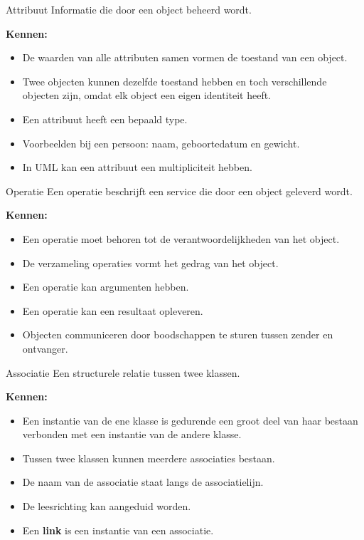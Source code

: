 \documentclass[11pt,a4paper]{article}
\begin{document}
\begin{definition}{Attribuut}
Informatie die door een object beheerd wordt.

\textbf{Kennen:}
\begin{itemize}
    \item De waarden van alle attributen samen vormen de toestand van een object.
    \item Twee objecten kunnen dezelfde toestand hebben en toch verschillende objecten zijn, omdat elk object een eigen identiteit heeft.
    \item Een attribuut heeft een bepaald type.
    \item Voorbeelden bij een persoon: naam, geboortedatum en gewicht.
    \item In UML kan een attribuut een multipliciteit hebben.
\end{itemize}
\end{definition}

\begin{definition}{Operatie}
Een operatie beschrijft een service die door een object geleverd wordt.

\textbf{Kennen:}
\begin{itemize}
    \item Een operatie moet behoren tot de verantwoordelijkheden van het object.
    \item De verzameling operaties vormt het gedrag van het object.
    \item Een operatie kan argumenten hebben.
    \item Een operatie kan een resultaat opleveren.
    \item Objecten communiceren door boodschappen te sturen tussen zender en ontvanger.
\end{itemize}
\end{definition}

\begin{definition}{Associatie}
Een structurele relatie tussen twee klassen.

\textbf{Kennen:}
\begin{itemize}
    \item Een instantie van de ene klasse is gedurende een groot deel van haar bestaan verbonden met een instantie van de andere klasse.
    \item Tussen twee klassen kunnen meerdere associaties bestaan.
    \item De naam van de associatie staat langs de associatielijn.
    \item De leesrichting kan aangeduid worden.
    \item Een \textbf{link} is een instantie van een associatie.
\end{itemize}
\end{definition}
\end{document}
